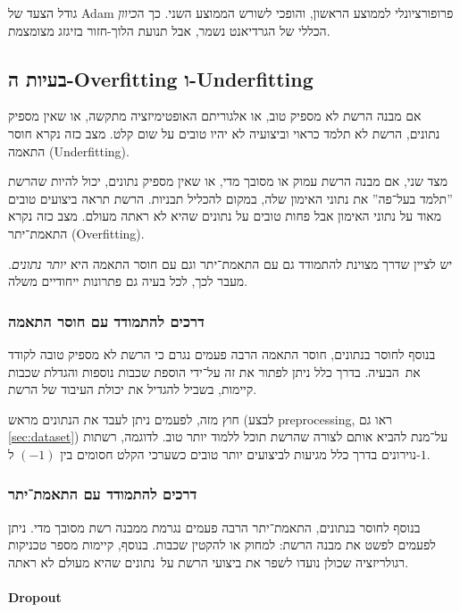 \documentclass[hebrew, a4paper]{article}
\theoremstyle{plain}
\theoremstyle{definition}
\numberwithin{equation}{section}
\begin{document}
גודל הצעד של Adam פרופורציונלי לממוצע הראשון, והופכי לשורש הממוצע
השני. כך ה\emph{כיוון} הכללי של הגרדיאנט נשמר, אבל תנועת הלוך-חזור
בזיגזג מצומצמת.

\subsection{בעיות ה-Overfitting ו-Underfitting}
\label{sec:overfitting-underfitting}

אם מבנה הרשת לא מספיק טוב, או אלגוריתם האופטימיזציה מתקשה, או שאין
מספיק נתונים, הרשת לא תלמד כראוי וביצועיה לא יהיו טובים על שום קלט.
מצב כזה נקרא חוסר התאמה (Underfitting).

מצד שני, אם מבנה הרשת עמוק או מסובך מדי, או שאין מספיק נתונים, יכול
להיות שהרשת ”תלמד בעל־פה” את נתוני האימון שלה, במקום להכליל תבניות.
הרשת תראה ביצועים טובים מאוד על נתוני האימון אבל פחות טובים על נתונים
שהיא לא ראתה מעולם. מצב כזה נקרא התאמת־יתר (Overfitting).

יש לציין שדרך מצוינת להתמודד גם עם התאמת־יתר וגם עם חוסר התאמה היא
\emph{יותר נתונים}. מעבר לכך, לכל בעיה גם פתרונות ייחודיים משלה.

\subsubsection{דרכים להתמודד עם חוסר התאמה}
\label{sec:underfitting-solutions}

בנוסף לחוסר בנתונים, חוסר התאמה הרבה פעמים נגרם כי הרשת לא מספיק
טובה לקודד את~הבעיה. בדרך כלל ניתן לפתור את זה על־ידי הוספת שכבות
נוספות והגדלת שכבות קיימות, בשביל להגדיל את יכולת העיבוד של הרשת.

חוץ מזה, לפעמים ניתן לעבד את הנתונים מראש (לבצע preprocessing, ראו גם
\autoref{sec:dataset}) על־מנת להביא אותם לצורה שהרשת תוכל ללמוד יותר
טוב. לדוגמה, רשתות נוירונים בדרך כלל מגיעות לביצועים יותר טובים כשערכי
הקלט חסומים בין $(-1)$ ל-$1$.

\subsubsection{דרכים להתמודד עם התאמת־יתר}
\label{sec:overfitting-solutions}

בנוסף לחוסר בנתונים, התאמת־יתר הרבה פעמים נגרמת ממבנה רשת מסובך מדי.
ניתן לפעמים לפשט את מבנה הרשת: למחוק או להקטין שכבות. בנוסף, קיימות
מספר טכניקות רגולריזציה שכולן נועדו לשפר את ביצועי הרשת על~נתונים שהיא
מעולם לא ראתה.

\paragraph{Dropout}
\end{document}
